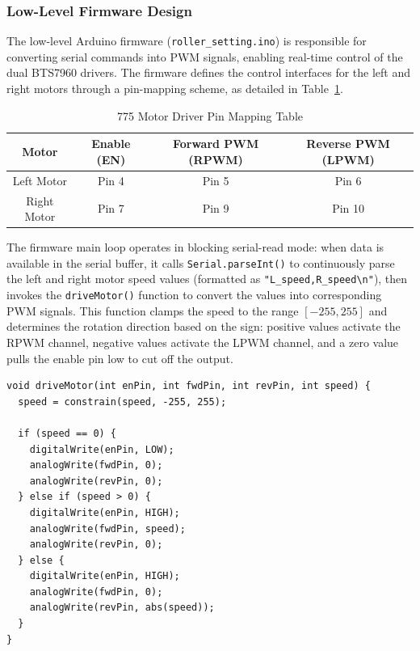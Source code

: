 \subsubsection{Low-Level Firmware Design}
\label{sec:motor_firmware}

The low-level Arduino firmware (\texttt{roller\_setting.ino}) is responsible for converting serial commands into PWM signals, enabling real-time control of the dual BTS7960 drivers. The firmware defines the control interfaces for the left and right motors through a pin-mapping scheme, as detailed in Table~\ref{tab:motor_pinmap}.

\begin{table}[htbp]
  \footnotesize
  \centering
  \caption{775 Motor Driver Pin Mapping Table}
  \label{tab:motor_pinmap}
  \renewcommand{\arraystretch}{1.2}
  \begin{tabular}{@{}cccc@{}}
    \toprule
    \textbf{Motor} & \textbf{Enable (EN)} & \textbf{Forward PWM (RPWM)} & \textbf{Reverse PWM (LPWM)} \\
    \midrule
    Left Motor  & Pin 4  & Pin 5 & Pin 6 \\
    Right Motor  & Pin 7  & Pin 9 & Pin 10 \\
    \bottomrule
  \end{tabular}
\end{table}

The firmware main loop operates in blocking serial-read mode: when data is available in the serial buffer, it calls \texttt{Serial.parseInt()} to continuously parse the left and right motor speed values (formatted as \texttt{"L\_speed,R\_speed\textbackslash n"}), then invokes the \texttt{driveMotor()} function to convert the values into corresponding PWM signals. This function clamps the speed to the range $[-255, 255]$ and determines the rotation direction based on the sign: positive values activate the RPWM channel, negative values activate the LPWM channel, and a zero value pulls the enable pin low to cut off the output.

\begin{verbatim}
void driveMotor(int enPin, int fwdPin, int revPin, int speed) {
  speed = constrain(speed, -255, 255);

  if (speed == 0) {
    digitalWrite(enPin, LOW);
    analogWrite(fwdPin, 0);
    analogWrite(revPin, 0);
  } else if (speed > 0) {
    digitalWrite(enPin, HIGH);
    analogWrite(fwdPin, speed);
    analogWrite(revPin, 0);
  } else {
    digitalWrite(enPin, HIGH);
    analogWrite(fwdPin, 0);
    analogWrite(revPin, abs(speed));
  }
}
\end{verbatim}

